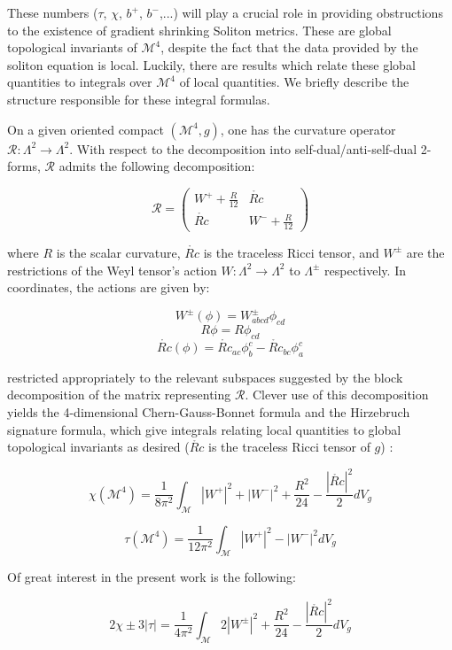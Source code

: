 \documentclass[openany, amssymb, psamsfonts]{amsart}
\theoremstyle{definition}
\numberwithin{equation}{section}
\begin{document}
    These numbers ($\tau$, $\chi$, $b^+$, $b^-$,...) will play a crucial role in providing obstructions to the existence of gradient shrinking Soliton metrics. These are global topological invariants of $\mathcal{M}^4$, despite the fact that the data provided by the soliton equation is local. Luckily, there are results which relate these global quantities to integrals over $\mathcal{M}^4$ of local quantities. We briefly describe the structure responsible for these integral formulas.

    On a given oriented compact $(\mathcal{M}^4, g)$, one has the curvature operator $\mathcal{R}: \Lambda^2 \rightarrow \Lambda^2$. With respect to the decomposition into self-dual/anti-self-dual 2-forms, $\mathcal{R}$ admits the following decomposition:

    $$\mathcal{R} = \begin{pmatrix}
W^+ + \frac{R}{12} & \mathring{Rc} \\
\mathring{Rc} & W^- + \frac{R}{12} 
\end{pmatrix}$$

where $R$ is the scalar curvature, $\mathring{Rc}$ is the traceless Ricci tensor, and $W^{\pm}$ are the restrictions of the Weyl tensor's action $W: \Lambda^2 \rightarrow \Lambda^2$ to $\Lambda^\pm$ respectively. In coordinates, the actions are given by:

$$W^\pm(\phi) = W^\pm_{abcd}\phi_{cd}$$
$$R\phi = R\phi_{cd}$$
$$\mathring{Rc}(\phi) = \mathring{Rc}_{ac}\phi^{c}_{b} - \mathring{Rc}_{bc}\phi^{c}_{a}$$

restricted appropriately to the relevant subspaces suggested by the block decomposition of the matrix representing $\mathcal{R}$. Clever use of this decomposition yields the 4-dimensional Chern-Gauss-Bonnet formula and the Hirzebruch signature formula, which give integrals relating local quantities to global topological invariants as desired ($\mathring{Rc}$ is the traceless Ricci tensor of $g$) \cite{ernani}:

$$\chi(\mathcal{M}^4) = \frac{1}{8\pi^2}\int_{\mathcal{M}} |W^+|^2 + |W^-|^2 + \frac{R^2}{24} - \frac{|\mathring{Rc}|^2}{2}dV_g$$

$$\tau({\mathcal{M}^4}) = \frac{1}{12\pi^2}\int_{\mathcal{M}} |W^+|^2 - |W^-|^2 dV_g$$

Of great interest in the present work is the following:

$$2\chi \pm 3|\tau| = \frac{1}{4\pi^2}\int_{\mathcal{M}} 2|W^\pm|^2 + \frac{R^2}{24} - \frac{|\mathring{Rc}|^2}{2}dV_g$$
\end{document}
